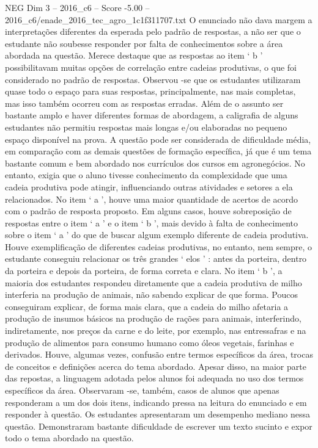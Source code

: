 \begin{textsample}{NEG Dim 3 – 2016\_c6 – Score -5.00 – 2016\_c6/enade\_2016\_tec\_agro\_1c1f311707.txt}
O enunciado não dava margem a interpretações diferentes da esperada pelo padrão de respostas, a não ser que o estudante não soubesse responder por falta de conhecimentos sobre a área abordada na questão.
Merece destaque que as respostas ao item ‘ b ’ possibilitavam muitas opções de correlação entre cadeias produtivas, o que foi considerado no padrão de respostas.
Observou -se que os estudantes utilizaram quase todo o espaço para suas respostas, principalmente, nas mais completas, mas isso também ocorreu com as respostas erradas.
Além de o assunto ser bastante amplo e haver diferentes formas de abordagem, a caligrafia de alguns estudantes não permitiu respostas mais longas e/ou elaboradas no pequeno espaço disponível na prova.
A questão pode ser considerada de dificuldade média, em comparação com as demais questões de formação específica, já que é um tema bastante comum e bem abordado nos currículos dos cursos em agronegócios.
No entanto, exigia que o aluno tivesse conhecimento da complexidade que uma cadeia produtiva pode atingir, influenciando outras atividades e setores a ela relacionados.
No item ‘ a ’, houve uma maior quantidade de acertos de acordo com o padrão de resposta proposto.
Em alguns casos, houve sobreposição de respostas entre o item ‘ a ’ e o item ‘ b ’, mais devido à falta de conhecimento sobre o item ‘ a ’ do que de buscar algum exemplo diferente de cadeia produtiva.
Houve exemplificação de diferentes cadeias produtivas, no entanto, nem sempre, o estudante conseguiu relacionar os três grandes ‘ elos ’ : antes da porteira, dentro da porteira e depois da porteira, de forma correta e clara.
No item ‘ b ’, a maioria dos estudantes respondeu diretamente que a cadeia produtiva de milho interferia na produção de animais, não sabendo explicar de que forma.
Poucos conseguiram explicar, de forma mais clara, que a cadeia do milho afetaria a produção de insumos básicos na produção de rações para animais, interferindo, indiretamente, nos preços da carne e do leite, por exemplo, nas entressafras e na produção de alimentos para consumo humano como óleos vegetais, farinhas e derivados.
Houve, algumas vezes, confusão entre termos específicos da área, trocas de conceitos e definições acerca do tema abordado.
Apesar disso, na maior parte das repostas, a linguagem adotada pelos alunos foi adequada no uso dos termos específicos da área.
Observaram -se, também, casos de alunos que apenas responderam a um dos dois itens, indicando pressa na leitura do enunciado e em responder à questão.
Os estudantes apresentaram um desempenho mediano nessa questão.
Demonstraram bastante dificuldade de escrever um texto sucinto e expor todo o tema abordado na questão.

\end{textsample}
